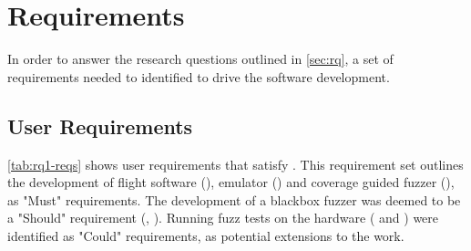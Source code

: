 \documentclass[../report.tex]{subfiles}
\begin{document}
\section{Requirements}

In order to answer the research questions outlined in \autoref{sec:rq}, a set
of requirements needed to identified to drive the software development.

\subsection{User Requirements} \label{sec:user-req}

\autoref{tab:rq1-reqs} shows user requirements that satisfy . This
requirement set outlines the development of flight software (),
emulator () and coverage guided fuzzer (), as
"Must" requirements. The development of a blackbox fuzzer was deemed to be a
"Should" requirement (, ). Running fuzz tests on
the hardware ( and ) were identified as "Could"
requirements, as potential extensions to the work.
\end{document}
